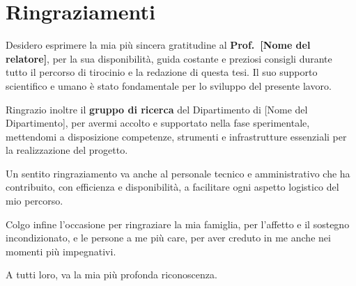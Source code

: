 \cleardoublepage
{}
\chapter*{Ringraziamenti}

Desidero esprimere la mia più sincera gratitudine al \textbf{Prof.~[Nome del relatore]}, per la sua disponibilità, guida costante e preziosi consigli durante tutto il percorso di tirocinio e la redazione di questa tesi. Il suo supporto scientifico e umano è stato fondamentale per lo sviluppo del presente lavoro.

Ringrazio inoltre il \textbf{gruppo di ricerca} del Dipartimento di [Nome del Dipartimento], per avermi accolto e supportato nella fase sperimentale, mettendomi a disposizione competenze, strumenti e infrastrutture essenziali per la realizzazione del progetto.

Un sentito ringraziamento va anche al personale tecnico e amministrativo che ha contribuito, con efficienza e disponibilità, a facilitare ogni aspetto logistico del mio percorso.

Colgo infine l’occasione per ringraziare la mia famiglia, per l’affetto e il sostegno incondizionato, e le persone a me più care, per aver creduto in me anche nei momenti più impegnativi.

A tutti loro, va la mia più profonda riconoscenza.
